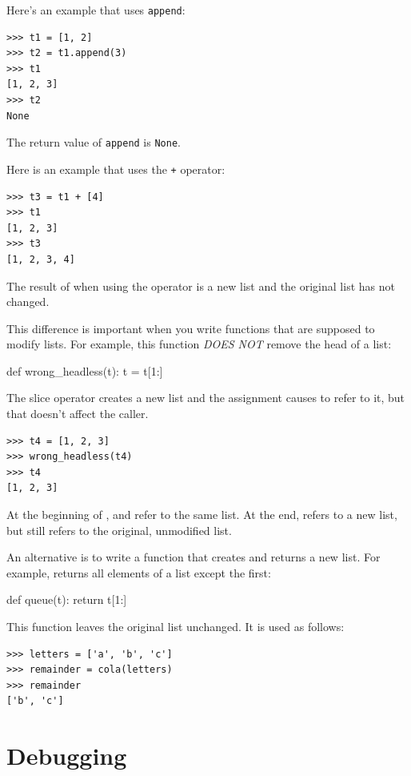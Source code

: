 Here's an example that uses \texttt{append}:
%
\begin{Verbatim}[frame=single]
>>> t1 = [1, 2]
>>> t2 = t1.append(3)
>>> t1
[1, 2, 3]
>>> t2
None
\end{Verbatim}
%
The return value of \texttt{append} is \texttt{None}.

Here is an example that uses the \texttt{+} operator:
%
\begin{Verbatim}[frame=single]
>>> t3 = t1 + [4]
>>> t1
[1, 2, 3]
>>> t3
[1, 2, 3, 4]
\end{Verbatim}
%
The result of when using the operator is a new list and the original list has not changed.

This difference is important when you write functions that are supposed to modify lists. For example, this function {\em DOES NOT} remove the head of a list:
%
\begin{python}[frame=single]
def wrong_headless(t):
    t = t[1:]              
\end{python}
%
The slice operator creates a new list and the assignment causes  to refer to it, but that doesn't affect the caller.
%
\begin{Verbatim}[frame=single]
>>> t4 = [1, 2, 3]
>>> wrong_headless(t4)
>>> t4
[1, 2, 3]
\end{Verbatim}
%
At the beginning of ,  and  refer to the same list. At the end,  refers to a new list, but  still refers to the original, unmodified list.

An alternative is to write a function that creates and returns a new list. For example,  returns all elements of a list except the first:

\begin{python}[frame=single]
def queue(t):
    return t[1:]
\end{python}
%
This function leaves the original list unchanged.
It is used as follows:

\begin{Verbatim}[frame=single]
>>> letters = ['a', 'b', 'c']
>>> remainder = cola(letters)
>>> remainder
['b', 'c']
\end{Verbatim}



\section{Debugging}

